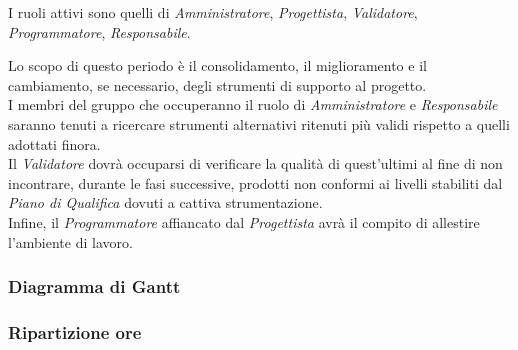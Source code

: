 I ruoli attivi sono quelli di \textit{Amministratore}, \textit{Progettista}, \textit{Validatore}, \textit{Programmatore}, \textit{Responsabile}.


Lo scopo di questo periodo \`e il consolidamento, il miglioramento e il cambiamento, se necessario, degli strumenti di supporto al progetto.\\
I membri del gruppo che occuperanno il ruolo di \textit{Amministratore} e \textit{Responsabile} saranno tenuti a ricercare strumenti alternativi ritenuti pi\`u validi rispetto a quelli adottati finora.\\
Il \textit{Validatore} dovr\`a occuparsi di verificare la qualit\`a di quest'ultimi al fine di non incontrare, durante le fasi successive, prodotti non conformi ai livelli stabiliti dal \textit{Piano di Qualifica} dovuti a cattiva strumentazione.\\
Infine, il \textit{Programmatore} affiancato dal \textit{Progettista} avr\`a il compito di allestire l'ambiente di lavoro.

\subsubsection{Diagramma di Gantt}

\subsubsection{Ripartizione ore}

